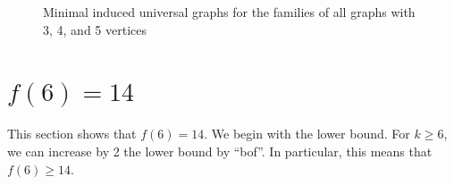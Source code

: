 \documentclass[12pt]{article}
\begin{document}
\begin{figure}[htb]
\caption{Minimal induced universal graphs for the families of all
graphs with 3, 4, and 5 vertices}
\label{fig:graphs}
\end{figure}

\section{\texorpdfstring{$f(6) = 14$}{f(6)=14}}\label{sec:f6}

This section shows that $f(6) = 14$.  We begin with the lower bound.
For $k \geq 6$, we can increase by 2 the lower bound by ``bof''.  In particular,
this means that $f(6) \geq 14$.
\end{document}
